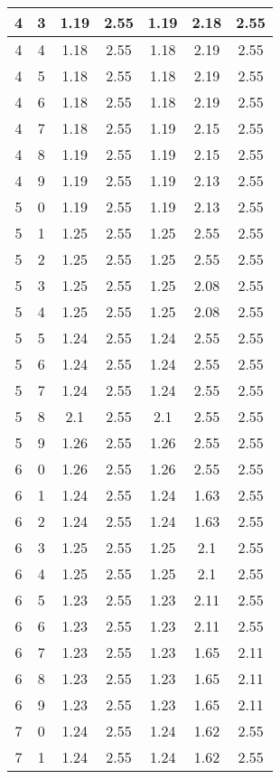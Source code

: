 \begin{longtable}{|c|c||c||c||c|c|c|}
	4 & 3 & 1.19 & 2.55 & 1.19 & 2.18 & 2.55 \\ \hline
	4 & 4 & 1.18 & 2.55 & 1.18 & 2.19 & 2.55 \\ \hline
	4 & 5 & 1.18 & 2.55 & 1.18 & 2.19 & 2.55 \\ \hline
	4 & 6 & 1.18 & 2.55 & 1.18 & 2.19 & 2.55 \\ \hline
	4 & 7 & 1.18 & 2.55 & 1.19 & 2.15 & 2.55 \\ \hline
	4 & 8 & 1.19 & 2.55 & 1.19 & 2.15 & 2.55 \\ \hline
	4 & 9 & 1.19 & 2.55 & 1.19 & 2.13 & 2.55 \\ \hline
	5 & 0 & 1.19 & 2.55 & 1.19 & 2.13 & 2.55 \\ \hline
	5 & 1 & 1.25 & 2.55 & 1.25 & 2.55 & 2.55 \\ \hline
	5 & 2 & 1.25 & 2.55 & 1.25 & 2.55 & 2.55 \\ \hline
	5 & 3 & 1.25 & 2.55 & 1.25 & 2.08 & 2.55 \\ \hline
	5 & 4 & 1.25 & 2.55 & 1.25 & 2.08 & 2.55 \\ \hline
	5 & 5 & 1.24 & 2.55 & 1.24 & 2.55 & 2.55 \\ \hline
	5 & 6 & 1.24 & 2.55 & 1.24 & 2.55 & 2.55 \\ \hline
	5 & 7 & 1.24 & 2.55 & 1.24 & 2.55 & 2.55 \\ \hline
	5 & 8 & 2.1 & 2.55 & 2.1 & 2.55 & 2.55 \\ \hline
	5 & 9 & 1.26 & 2.55 & 1.26 & 2.55 & 2.55 \\ \hline
	6 & 0 & 1.26 & 2.55 & 1.26 & 2.55 & 2.55 \\ \hline
	6 & 1 & 1.24 & 2.55 & 1.24 & 1.63 & 2.55 \\ \hline
	6 & 2 & 1.24 & 2.55 & 1.24 & 1.63 & 2.55 \\ \hline
	6 & 3 & 1.25 & 2.55 & 1.25 & 2.1 & 2.55 \\ \hline
	6 & 4 & 1.25 & 2.55 & 1.25 & 2.1 & 2.55 \\ \hline
	6 & 5 & 1.23 & 2.55 & 1.23 & 2.11 & 2.55 \\ \hline
	6 & 6 & 1.23 & 2.55 & 1.23 & 2.11 & 2.55 \\ \hline
	6 & 7 & 1.23 & 2.55 & 1.23 & 1.65 & 2.11 \\ \hline
	6 & 8 & 1.23 & 2.55 & 1.23 & 1.65 & 2.11 \\ \hline
	6 & 9 & 1.23 & 2.55 & 1.23 & 1.65 & 2.11 \\ \hline
	7 & 0 & 1.24 & 2.55 & 1.24 & 1.62 & 2.55 \\ \hline
	7 & 1 & 1.24 & 2.55 & 1.24 & 1.62 & 2.55 \\ \hline

\end{longtable}
